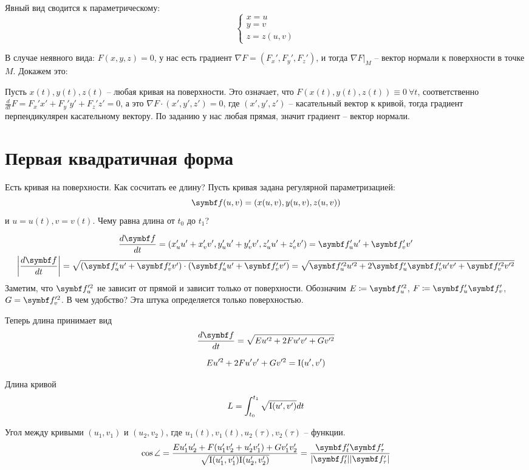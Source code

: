 \documentclass[main]{subfiles}
\begin{document}
Явный вид сводится к параметрическому:
\[\begin{cases}
        x = u \\
        y = v \\
        z = z(u,v)
    \end{cases}\]

В случае неявного вида: $F(x,y,z) = 0$,
у нас есть градиент $\nabla F = (F_x', F_y', F_z')$, и тогда
$\nabla F |_M$ -- вектор нормали к поверхности в точке $M$. Докажем это:

Пусть $x(t), y(t), z(t)$ -- любая кривая на поверхности.
Это означает, что $F(x(t), y(t), z(t)) \equiv 0\ \forall t$, соответственно
$\frac{d}{dt}F = F_x' x' + F_y' y' + F_z' z' =0$, а это
$\nabla F \cdot (x', y', z') = 0$, где
$(x', y', z')$ -- касательный вектор к кривой,
тогда градиент перпендикулярен касательному вектору.
По заданию у нас любая прямая, значит градиент -- вектор нормали.

\section{Первая квадратичная форма}
Есть кривая на поверхности. Как сосчитать ее длину?
Пусть кривая задана регулярной параметризацией:
\[\vf(u,v) = (x(u,v), y(u,v), z(u,v))\]
и $u = u(t), v = v(t)$.
Чему равна длина от $t_0$ до $t_1$?

\begin{gather*}
    \frac{d\vf}{dt} = (x_u' u' + x_v' v', y_u' u' + y_v' v', z_u' u' + z_v' v') = \vf_u' u' + \vf_v' v'\\
    \left| \frac{d\vf}{dt} \right| = \sqrt{(\vf_u' u' + \vf_v' v') \cdot (\vf_u' u' + \vf_v' v')} = \sqrt{\vf_u'^2 u'^2 + 2 \vf_u'\vf_v' u'v' + \vf_v'^2 v'^2}
\end{gather*}
Заметим, что $\vf_u'^2$ не зависит от прямой и зависит только от поверхности.
Обозначим $E \coloneqq \vf_u'^2$, $F \coloneqq \vf_u' \vf_v'$, $G = \vf_v'^2$.
В чем удобство? Эта штука определяется только поверхностью.

Теперь длина принимает вид
\[\frac{d\vf}{dt} = \sqrt{E u'^2 + 2Fu'v' + Gv'^2}\]
\begin{definition}
    \[Eu'^2 + 2F u'v' + G v'^2 = \mathrm{I}(u',v')\]
\end{definition}
\begin{theorem}
    Длина кривой
    \[L = \int_{t_0}^{t_1} \sqrt{\mathrm{I}(u', v')} dt\]
\end{theorem}
\begin{theorem}
    Угол между кривыми $(u_1, v_1)$ и $(u_2, v_2)$, где
    $u_1(t), v_1(t), u_2(\tau), v_2(\tau)$ -- функции.
    \[\cos\angle = \frac{Eu_1' u_2' + F(u_1' v_2' + u_2' v_1') + G v_1' v_2'}{\sqrt{\fff(u_1', v_1')\fff(u_2', v_2')}} = \frac{\vf_t' \vf_\tau '}{|\vf_t'| |\vf_\tau'|}\]
\end{theorem}
\end{document}
